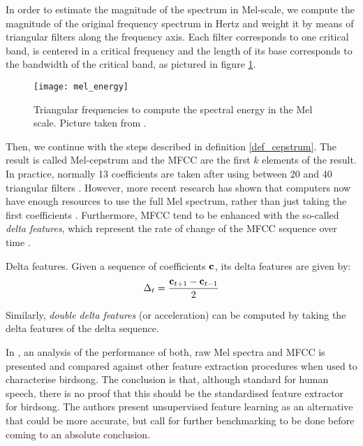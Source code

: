 \documentclass[../main.tex]{subfiles} \label{chapter_soa}
\begin{document}
\par In order to estimate the magnitude of the spectrum in Mel-scale, we compute the magnitude of the original frequency spectrum in Hertz and weight it by means of triangular filters along the frequency axis. Each filter corresponds to one critical band, is centered in a critical frequency and the length of its base corresponds to the bandwidth of the critical band, as pictured in figure \ref{mel_energy}.


\begin{figure}[t]
\texttt{[image: mel\_energy]}
\caption{Triangular frequencies to compute the spectral energy in the Mel scale. Picture taken from \cite{Sludge2000}.}
\label{mel_energy}
\end{figure}

\par Then, we continue with the steps described in definition \ref{def_cepstrum}. The result is called Mel-cepstrum and the MFCC are the first $k$ elements of the result. In practice, normally 13 coefficients are taken after using between 20 and 40 triangular filters \cite{Gutierrez-Osuna2009}. However, more recent research has shown that computers now have enough resources to use the full Mel spectrum, rather than just taking the first coefficients \cite{Stowell2014}. Furthermore, MFCC tend to be enhanced with the so-called \emph{delta features}, which represent the rate of change of the MFCC sequence over time \cite{Muda2010} \cite{Lyons2014}. 
\begin{definition}{Delta features.} \label{def_delta_mfcc}
Given a sequence of coefficients $\mathbf{c}$, its delta features are given by:
\begin{align*}
\Delta_t = \frac{\mathbf{c}_{t+1} - \mathbf{c}_{t-1}}{2}
\end{align*}
\end{definition}
\par Similarly, \emph{double delta features} (or acceleration) can be computed by taking the delta features of the delta sequence. 
\par In \cite{Stowell2014}, an analysis of the performance of both, raw Mel spectra and MFCC is presented and compared against other feature extraction procedures when used to characterise birdsong. The conclusion is that, although standard for human speech, there is no proof that this should be the standardised feature extractor for birdsong. The authors present unsupervised feature learning as an alternative that could be more accurate, but call for further benchmarking to be done before coming to an absolute conclusion.
\end{document}
